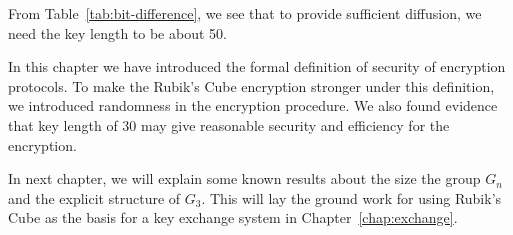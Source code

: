 From Table~\ref{tab:bit-difference}, we see that to provide sufficient diffusion, we need the key length to be about 50.
\par In this chapter we have introduced the formal definition of security of encryption protocols. To make the Rubik's Cube encryption stronger under this definition, we introduced randomness in the encryption procedure. We also found evidence that key length of 30 may give reasonable security and efficiency for the encryption.
\par In next chapter, we will explain some known results about the size the group $G_n$ and the explicit structure of $G_3$. This will lay the ground work for using Rubik's Cube as the basis for a key exchange system in Chapter~\ref{chap:exchange}.
